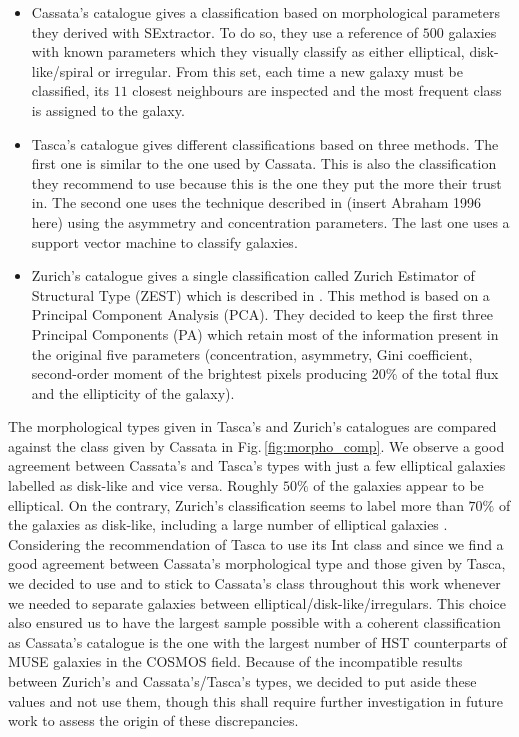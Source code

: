 \begin{itemize}
	\item Cassata's catalogue gives a classification based on morphological parameters they derived with SExtractor. To do so, they use a reference of $500$ galaxies with known parameters which they visually classify as either elliptical, disk-like/spiral or irregular. From this set, each time a new galaxy must be classified, its $11$ closest neighbours are inspected and the most frequent class is assigned to the galaxy.
	
	\item Tasca's catalogue gives different classifications based on three methods. The first one is similar to the one used by Cassata. This is also the classification they recommend to use because this is the one they put the more their trust in. The second one uses the technique described in (insert Abraham 1996 here) using the asymmetry and concentration parameters. The last one uses a support vector machine to classify galaxies.
	
	\item Zurich's catalogue gives a single classification called Zurich Estimator of Structural Type (ZEST) which is described in . This method is based on a Principal Component Analysis (PCA). They decided to keep the first three Principal Components (PA) which retain most of the information present in the original five parameters (concentration, asymmetry, Gini coefficient, second-order moment of the brightest pixels producing $20\%$ of the total flux and the ellipticity of the galaxy).
\end{itemize}

The morphological types given in Tasca's and Zurich's catalogues are compared against the class given by Cassata in Fig.\,\ref{fig:morpho_comp}. We observe a good agreement between Cassata's and Tasca's types with just a few elliptical galaxies labelled as disk-like and vice versa. Roughly $50\%$ of the galaxies appear to be elliptical. On the contrary, Zurich's classification seems to label more than $70\%$ of the galaxies as disk-like, including a large number of elliptical galaxies .\\

Considering the recommendation of Tasca to use its Int class and since we find a good agreement between Cassata's morphological type and those given by Tasca, we decided to use and to stick to Cassata's class throughout this work whenever we needed to separate galaxies between elliptical/disk-like/irregulars. This choice also ensured us to have the largest sample possible with a coherent classification as Cassata's catalogue is the one with the largest number of HST counterparts of MUSE galaxies in the COSMOS field. Because of the incompatible results between Zurich's and Cassata's/Tasca's types, we decided to put aside these values and not use them, though this shall require further investigation in future work to assess the origin of these discrepancies.

